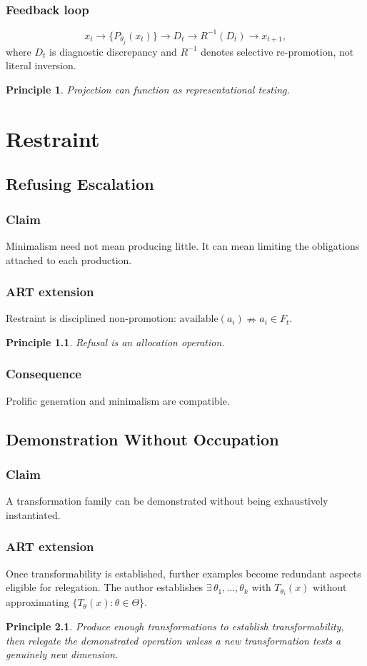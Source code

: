 \documentclass[11pt,openany]{book}
\newtheorem{principle}{Principle}[chapter]
\begin{document}
\section{Feedback loop}
\[
  x_t\to\{P_{\theta_j}(x_t)\}\to D_t\to R^{-1}(D_t)\to x_{t+1},
\]
where $D_t$ is diagnostic discrepancy and $R^{-1}$ denotes selective
re-promotion, not literal inversion.
\begin{principle}
Projection can function as representational testing.
\end{principle}

\part{Restraint}

\chapter{Refusing Escalation}
\section{Claim}
Minimalism need not mean producing little. It can mean limiting the
obligations attached to each production.
\section{ART extension}
Restraint is disciplined non-promotion:
$\text{available}(a_i)\nRightarrow a_i\in F_t$.
\begin{principle}
Refusal is an allocation operation.
\end{principle}
\section{Consequence}
Prolific generation and minimalism are compatible.

\chapter{Demonstration Without Occupation}
\section{Claim}
A transformation family can be demonstrated without being exhaustively
instantiated.
\section{ART extension}
Once transformability is established, further examples become redundant
aspects eligible for relegation. The author establishes
$\exists\,\theta_1,\ldots,\theta_k$ with $T_{\theta_i}(x)$ without
approximating $\{T_\theta(x):\theta\in\Theta\}$.
\begin{principle}
Produce enough transformations to establish transformability, then
relegate the demonstrated operation unless a new transformation tests a
genuinely new dimension.
\end{principle}
\end{document}
